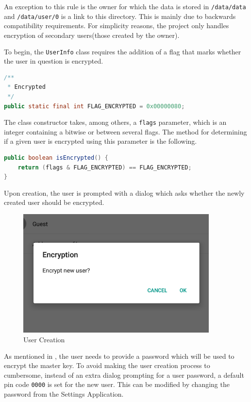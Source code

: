 An exception to this rule is the owner for which the data is stored in \texttt{/data/data} and \texttt{/data/user/0} is a link to this directory. This is mainly due to backwards compatibility requirements. For simplicity reasons, the project only handles encryption of  secondary users(those created by the owner).

To begin, the \texttt{UserInfo} class requires the addition of a flag that marks whether the user in question is encrypted.
\begin{lstlisting}[language=Java, numbers=none, caption=Encrypted User Flag, label=lst:encr-flag-multi-user]
/**
 * Encrypted
 */
public static final int FLAG_ENCRYPTED = 0x00000080;
\end{lstlisting}
The class constructor takes, among others, a \texttt{flags} parameter, which is an integer containing a bitwise or between several flags. The method for determining if a given user is encrypted using this parameter is the following.
\begin{lstlisting}[language=Java, numbers=none, caption=isEncrypted method, label=lst:encr-method-multi-user]
public boolean isEncrypted() {
	return (flags & FLAG_ENCRYPTED) == FLAG_ENCRYPTED;
}
\end{lstlisting}

Upon creation, the user is prompted with a dialog which asks whether the newly created user should be encrypted.

\begin{figure}[h!]
\centering
    \includegraphics[width=0.9\textwidth]{src/img/multi-user/newuser.png}
\caption{User Creation}
\end{figure}

As mentioned in , the user needs to provide a password which will be used to encrypt the master key. To avoid making the user creation process to cumbersome, instead of an extra dialog prompting for a user password, a default pin code \texttt{0000} is set for the new user. This can be modified by changing the password from the Settings Application.

